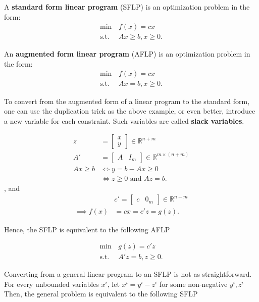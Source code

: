 \begin{definition}
  A \textbf{standard form linear program} (SFLP) is an optimization problem in the
  form:
  \begin{align*}
  \min\, &f(x) = cx\\
  \text{s.t.}\, & Ax\ge b, x \ge  0
  .\end{align*}

  An \textbf{augmented form linear program} (AFLP) is an optimization problem in the
  form:
  \begin{align*}
  \min\, &f(x) = cx\\
  \text{s.t.}\, & Ax=  b, x \ge  0
  .\end{align*}
\end{definition}

To convert from the augmented form of a linear program to the standard form, one
can use the duplication trick as the above example, or even better, introduce a
new variable for each constraint. Such variables are called \textbf{slack
variables}.

\begin{align*}
  z &= \begin{bmatrix} x \\ y \end{bmatrix} \in \mathbb{R}^{n + m}\\
  A' &= \begin{bmatrix} A & I_{m} \end{bmatrix} \in \mathbb{R}^{m \times (n +
  m)}\\
    Ax \ge b &\iff y = b - Ax \ge  0\\
     &\iff  z \ge 0 \text{ and } Az = b
.\end{align*}, and
\begin{align*}
  &c' = \begin{bmatrix} c & 0_{m} \end{bmatrix} \in \mathbb{R}^{n + m}\\
  \implies f(x) &= cx = c'z = g(z)
.\end{align*}

Hence, the SFLP is equivalent to the following AFLP

  \begin{align*}
  \min\, &g(z) = c'z\\
  \text{s.t.}\, & A'z=  b, z \ge  0
  .\end{align*}

Converting from a general linear program to an SFLP is not as straightforward.
For every unbounded variables \( x^{i} \), let \( x^{i} = y^{i} - z^{i} \) for
some non-negative \( y^{i}, z^{i} \)
Then, the general problem is equivalent to the following SFLP

